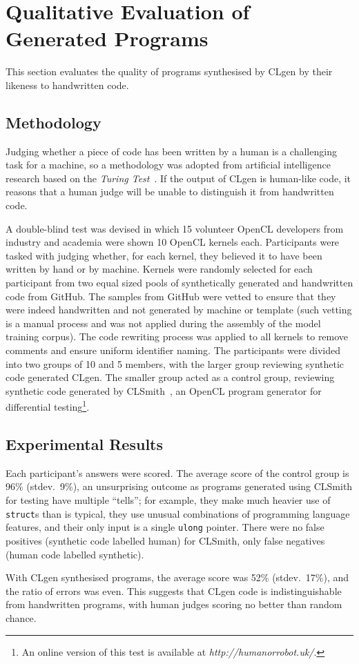 \section{Qualitative Evaluation of Generated Programs}
\label{sec:clgen-qualitative-evaluation}

This section evaluates the quality of programs synthesised by CLgen by their likeness to handwritten code.

\subsection{Methodology}

Judging whether a piece of code has been written by a human is a challenging task for a machine, so a methodology was adopted from artificial intelligence research based on the \emph{Turing Test}~\cite{Gao2015a,Zhang2016,Vinyals}. If the output of CLgen is human-like code, it reasons that a human judge will be unable to distinguish it from handwritten code.

A double-blind test was devised in which 15 volunteer OpenCL developers from industry and academia were shown 10 OpenCL kernels each. Participants were tasked with judging whether, for each kernel, they believed it to have been written by hand or by machine. Kernels were randomly selected for each participant from two equal sized pools of synthetically generated and handwritten code from GitHub. The samples from GitHub were vetted to ensure that they were indeed handwritten and not generated by machine or template (such vetting is a manual process and was not applied during the assembly of the model training corpus). The code rewriting process was applied to all kernels to remove comments and ensure uniform identifier naming. The participants were divided into two groups of 10 and 5 members, with the larger group reviewing synthetic code generated CLgen. The smaller group acted as a control group, reviewing synthetic code generated by CLSmith~\cite{Lidbury2015a}, an OpenCL program generator for differential testing\footnote{An online version of this test is available at \emph{http://humanorrobot.uk/}.}.

\subsection{Experimental Results}

Each participant's answers were scored. The average score of the control group is 96\% (stdev.\ 9\%), an unsurprising outcome as programs generated using CLSmith for testing have multiple ``tells''; for example, they make much heavier use of \texttt{struct}s than is typical, they use unusual combinations of programming language features, and their only input is a single \texttt{ulong} pointer. There were no false positives (synthetic code labelled human) for CLSmith, only false negatives (human code labelled synthetic).

With CLgen synthesised programs, the average score was 52\% (stdev.\ 17\%), and the ratio of errors was even. This suggests that CLgen code is indistinguishable from handwritten programs, with human judges scoring no better than random chance.
